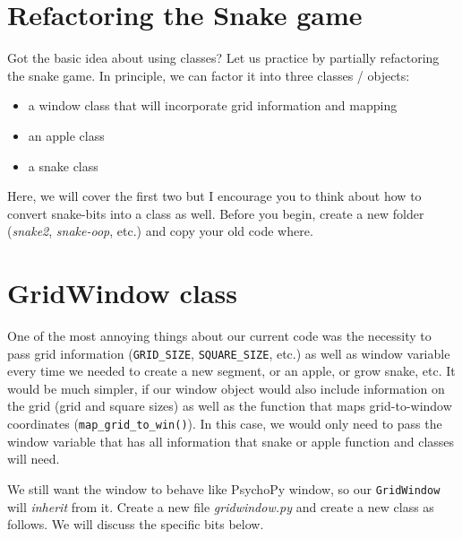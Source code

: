 \documentclass[
]{book}
\providecommand{\tightlist}{%
  \setlength{\itemsep}{0pt}\setlength{\parskip}{0pt}}
\begin{document}
\hypertarget{refactoring-the-snake-game}{%
\section{Refactoring the Snake game}\label{refactoring-the-snake-game}}

Got the basic idea about using classes? Let us practice by partially refactoring the snake game. In principle, we can factor it into three classes / objects:

\begin{itemize}
\tightlist
\item
  a window class that will incorporate grid information and mapping
\item
  an apple class
\item
  a snake class
\end{itemize}

Here, we will cover the first two but I encourage you to think about how to convert snake-bits into a class as well. Before you begin, create a new folder (\emph{snake2}, \emph{snake-oop}, etc.) and copy your old code where.

\hypertarget{gridwindow-class}{%
\section{GridWindow class}\label{gridwindow-class}}

One of the most annoying things about our current code was the necessity to pass grid information (\texttt{GRID\_SIZE}, \texttt{SQUARE\_SIZE}, etc.) as well as window variable every time we needed to create a new segment, or an apple, or grow snake, etc. It would be much simpler, if our window object would also include information on the grid (grid and square sizes) as well as the function that maps grid-to-window coordinates (\texttt{map\_grid\_to\_win()}). In this case, we would only need to pass the window variable that has all information that snake or apple function and classes will need.

We still want the window to behave like PsychoPy window, so our \texttt{GridWindow} will \emph{inherit} from it. Create a new file \emph{gridwindow.py} and create a new class as follows. We will discuss the specific bits below.
\end{document}
